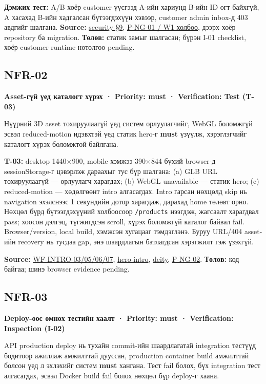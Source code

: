 \textbf{Дэмжих тест:} A/B хоёр customer үүсгээд A-ийн хариунд B-ийн ID
огт байхгүй, A хасахад B-ийн хадгалсан бүтээгдэхүүн хэвээр, customer
admin inbox-д 403 авдгийг шалгана. \textbf{Source:}
\href{../../phase-0/08-security.md\#9-idor-prevention}{security §9},
\href{wiki/persona-and-pivot.md}{P-NG-01 / W1 холбоо}, дээрх хоёр
repository ба migration. \textbf{Төлөв:} статик замыг шалгасан; бүрэн
I-01 checklist, хоёр-customer runtime нотолгоо pending.

\clearpage
\subsection{NFR-02}\label{doc4-nfr-02}

\textbf{Asset-гүй үед каталогт хүрэх · Priority: must · Verification:
Test (T-03)}

Нүүрний 3D asset тохируулаагүй үед систем орлуулагчийг, WebGL боломжгүй
эсвэл reduced-motion идэвхтэй үед статик hero-г \textbf{must} үзүүлж,
хэрэглэгчийг каталогт хүрэх боломжтой байлгана.

\textbf{T-03:} desktop 1440×900, mobile хэмжээ 390×844 бүхий browser-д
sessionStorage-г цэвэрлэж дараахыг тус бүр шалгана: (a) GLB URL
тохируулаагүй --- орлуулагч харагдах; (b) WebGL unavailable --- статик
hero; (c) reduced-motion --- хөдөлгөөнт intro алгасагдах. Intro гарсан
нөхцөлд skip нь navigation эхэлснээс 1 секундийн дотор харагдаж, дарахад
home төлөвт орно. Нөхцөл бүрд бүтээгдэхүүний холбоосоор
\nolinkurl{/products} нээгдэж, жагсаалт харагдвал pass; хоосон дэлгэц,
түгжигдсэн scroll, хүрэх боломжгүй каталог байвал fail. Browser/version,
local build, хэмжсэн хугацааг тэмдэглэнэ. Буруу URL/404 asset-ийн
recovery нь тусдаа gap, энэ шаардлагын батлагдсан хэрэгжилт гэж үзэхгүй.

\textbf{Source:}
\href{../../phase-0/07-uiux-wireframes.md}{WF-INTRO-03/05/06/07},
\href{../../../apps/web/src/components/intro/hero-intro.tsx}{hero-intro},
\href{../../../apps/web/src/components/intro/deity.tsx}{deity},
\href{wiki/persona-and-pivot.md}{P-NG-02}. \textbf{Төлөв:} код байгаа;
шинэ browser evidence pending.

\subsection{NFR-03}\label{doc4-nfr-03}

\textbf{Deploy-оос өмнөх тестийн хаалт · Priority: must · Verification:
Inspection (I-02)}

API production deploy нь тухайн commit-ийн шаардлагатай integration
тестүүд бодитоор ажиллаж амжилттай дууссан, production container build
амжилттай болсон үед л эхлэхийг систем \textbf{must} хангана. Тест fail
болох, бүх integration тест алгасагдах, эсвэл Docker build fail болох
нөхцөл бүр deploy-г хаана.

